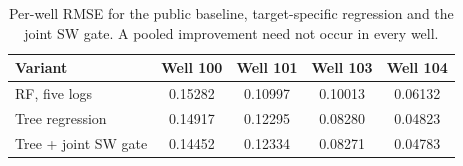 \begin{table}[t]
\centering
\caption{Public Volve reproducibility check. RMSE is pooled over VSH, PHIF and SW. Auxiliary tolerance is $\max(0,1-|a-y|/[c(|y|+10^{-7})])$, with $c=0.08$ for PHIF and $c=0.05$ for SW; it is not the contest's primary RMSE metric. Tolerance actions use 600 grid points between each target's bin representatives.}
\label{tab:public-metrics}
\small
{}
\end{table}

\begin{table}[t]
\centering
\caption{Per-well RMSE for the public baseline, target-specific regression and the joint SW gate. A pooled improvement need not occur in every well.}
\label{tab:public-wells}
\small
\setlength{\tabcolsep}{12pt}
\begin{tabular}{l cccc}
\toprule
Variant & Well 100 & Well 101 & Well 103 & Well 104 \\
\midrule
RF, five logs & 0.15282 & 0.10997 & 0.10013 & 0.06132 \\
Tree regression & 0.14917 & 0.12295 & 0.08280 & 0.04823 \\
Tree + joint SW gate & 0.14452 & 0.12334 & 0.08271 & 0.04783 \\
\bottomrule
\end{tabular}
\end{table}
